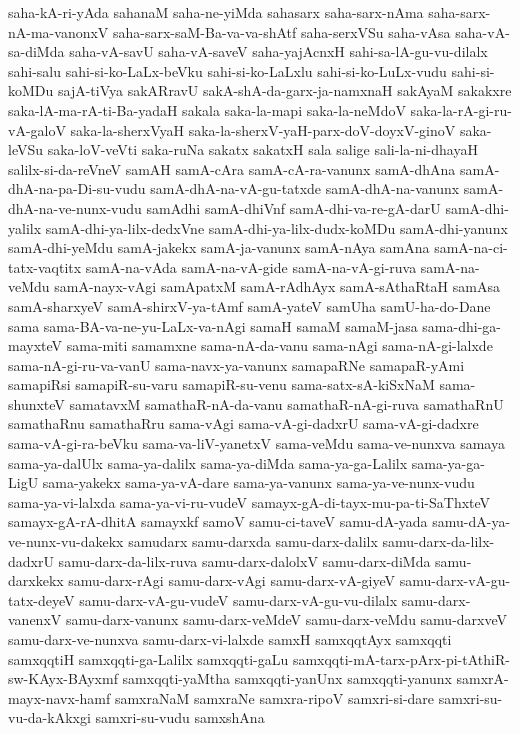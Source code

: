 {saha-kA-ri-yAda
sahanaM
saha-ne-yiMda
sahasarx
saha-sarx-nAma
saha-sarx-nA-ma-vanonxV
saha-sarx-saM-Ba-va-va-shAtf
saha-serxVSu
saha-vAsa
saha-vA-sa-diMda
saha-vA-savU
saha-vA-saveV
saha-yajAcnxH
sahi-sa-lA-gu-vu-dilalx
sahi-salu
sahi-si-ko-LaLx-beVku
sahi-si-ko-LaLxlu
sahi-si-ko-LuLx-vudu
sahi-si-koMDu
sajA-tiVya
sakARravU
sakA-shA-da-garx-ja-namxnaH
sakAyaM
sakakxre
saka-lA-ma-rA-ti-Ba-yadaH
sakala
saka-la-mapi
saka-la-neMdoV
saka-la-rA-gi-ru-vA-galoV
saka-la-sherxVyaH
saka-la-sherxV-yaH-parx-doV-doyxV-ginoV
saka-leVSu
saka-loV-veVti
saka-ruNa
sakatx
sakatxH
sala
salige
sali-la-ni-dhayaH
salilx-si-da-reVneV
samAH
samA-cAra
samA-cA-ra-vanunx
samA-dhAna
samA-dhA-na-pa-Di-su-vudu
samA-dhA-na-vA-gu-tatxde
samA-dhA-na-vanunx
samA-dhA-na-ve-nunx-vudu
samAdhi
samA-dhiVnf
samA-dhi-va-re-gA-darU
samA-dhi-yalilx
samA-dhi-ya-lilx-dedxVne
samA-dhi-ya-lilx-dudx-koMDu
samA-dhi-yanunx
samA-dhi-yeMdu
samA-jakekx
samA-ja-vanunx
samA-nAya
samAna
samA-na-ci-tatx-vaqtitx
samA-na-vAda
samA-na-vA-gide
samA-na-vA-gi-ruva
samA-na-veMdu
samA-nayx-vAgi
samApatxM
samA-rAdhAyx
samA-sAthaRtaH
samAsa
samA-sharxyeV
samA-shirxV-ya-tAmf
samA-yateV
samUha
samU-ha-do-Dane
sama
sama-BA-va-ne-yu-LaLx-va-nAgi
samaH
samaM
samaM-jasa
sama-dhi-ga-mayxteV
sama-miti
samamxne
sama-nA-da-vanu
sama-nAgi
sama-nA-gi-lalxde
sama-nA-gi-ru-va-vanU
sama-navx-ya-vanunx
samapaRNe
samapaR-yAmi
samapiRsi
samapiR-su-varu
samapiR-su-venu
sama-satx-sA-kiSxNaM
sama-shunxteV
samatavxM
samathaR-nA-da-vanu
samathaR-nA-gi-ruva
samathaRnU
samathaRnu
samathaRru
sama-vAgi
sama-vA-gi-dadxrU
sama-vA-gi-dadxre
sama-vA-gi-ra-beVku
sama-va-liV-yanetxV
sama-veMdu
sama-ve-nunxva
samaya
sama-ya-dalUlx
sama-ya-dalilx
sama-ya-diMda
sama-ya-ga-Lalilx
sama-ya-ga-LigU
sama-yakekx
sama-ya-vA-dare
sama-ya-vanunx
sama-ya-ve-nunx-vudu
sama-ya-vi-lalxda
sama-ya-vi-ru-vudeV
samayx-gA-di-tayx-mu-pa-ti-SaThxteV
samayx-gA-rA-dhitA
samayxkf
samoV
samu-ci-taveV
samu-dA-yada
samu-dA-ya-ve-nunx-vu-dakekx
samudarx
samu-darxda
samu-darx-dalilx
samu-darx-da-lilx-dadxrU
samu-darx-da-lilx-ruva
samu-darx-dalolxV
samu-darx-diMda
samu-darxkekx
samu-darx-rAgi
samu-darx-vAgi
samu-darx-vA-giyeV
samu-darx-vA-gu-tatx-deyeV
samu-darx-vA-gu-vudeV
samu-darx-vA-gu-vu-dilalx
samu-darx-vanenxV
samu-darx-vanunx
samu-darx-veMdeV
samu-darx-veMdu
samu-darxveV
samu-darx-ve-nunxva
samu-darx-vi-lalxde
samxH
samxqqtAyx
samxqqti
samxqqtiH
samxqqti-ga-Lalilx
samxqqti-gaLu
samxqqti-mA-tarx-pArx-pi-tAthiR-sw-KAyx-BAyxmf
samxqqti-yaMtha
samxqqti-yanUnx
samxqqti-yanunx
samxrA-mayx-navx-hamf
samxraNaM
samxraNe
samxra-ripoV
samxri-si-dare
samxri-su-vu-da-kAkxgi
samxri-su-vudu
samxshAna
}
